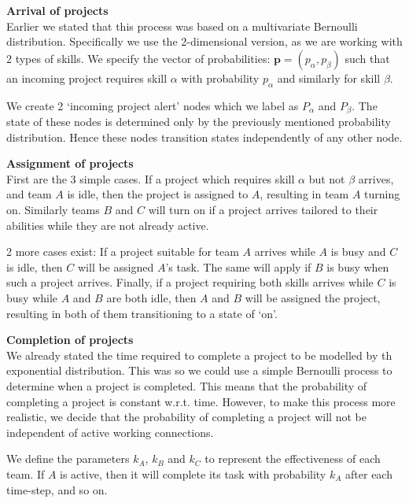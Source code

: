 \begin{steps}
	
	\item \textbf{Arrival of projects}\\
	Earlier we stated that this process was based on a multivariate Bernoulli distribution. Specifically we use the 2-dimensional version, as we are working with 2 types of skills. We specify the vector of probabilities: $\mathbf{p} = (p_\alpha, p_\beta)$ such that an incoming project requires skill $\alpha$ with probability $p_\alpha$ and similarly for skill $\beta$.
	
	We create 2 `incoming project alert' nodes which we label as $P_\alpha$ and $P_\beta$. The state of these nodes is determined only by the previously mentioned probability distribution. Hence these nodes transition states independently of any other node. 
	
	\item \textbf{Assignment of projects}\\
	First are the 3 simple cases. If a project which requires skill $\alpha$ but not $\beta$ arrives, and team $A$ is idle, then the project is assigned to $A$, resulting in team $A$ turning on. Similarly teams $B$ and $C$ will turn on if a project arrives tailored to their abilities while they are not already active.	
	
	2 more cases exist: If a project suitable for team $A$ arrives while $A$ is busy and $C$ is idle, then $C$ will be assigned $A$'s task. The same will apply if $B$ is busy when such a project arrives. Finally, if a project requiring both skills arrives while $C$ is busy while $A$ and $B$ are both idle, then $A$ and $B$ will be assigned the project, resulting in both of them transitioning to a state of `on'.
	
	\item \textbf{Completion of projects}\\
	We already stated the time required to complete a project to be modelled by th exponential distribution. This was so we could use a simple Bernoulli process to determine when a project is completed. This means that the probability of completing a project is constant w.r.t. time. However, to make this process more realistic, we decide that the probability of completing a project will not be independent of active working connections.
	
	We define the parameters $k_A$, $k_B$ and $k_C$ to represent the effectiveness of each team. If $A$ is active, then it will complete its task with probability $k_A$ after each time-step, and so on. 
	

\end{steps}
